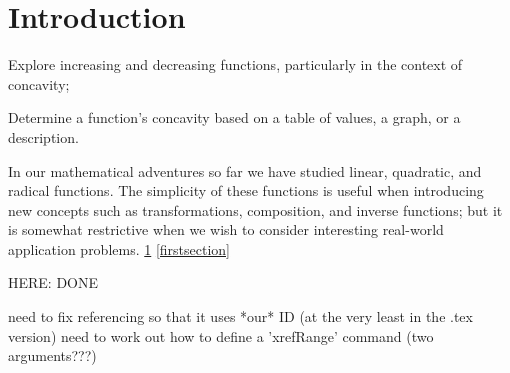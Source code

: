 \typeout{************************************************}
\typeout{************************************************}
%
\section{Introduction}\label{firstsection}
%
\begin{outcomes}
\begin{outcomelist}
\item  Explore increasing and decreasing functions, particularly in the context of concavity;%
\item  Determine a function's concavity based on a table of values, a graph, or a description. %
\end{outcomelist}
\end{outcomes}

In our mathematical adventures so far we have studied linear, quadratic, 
and radical functions. The simplicity of these functions is useful when 
introducing new concepts such as transformations, composition, and 
inverse functions; but it is somewhat restrictive when we wish to 
consider interesting real-world application problems. 
\cref{firstsection} 
\vref{firstsection} 

%
\par 
HERE:
DONE

need to fix referencing so that it uses *our* ID (at the very least in the .tex version)
need to work out how to define a 'xrefRange' command (two arguments???)
  
%
\typeout{************************************************}
\typeout{************************************************}
%
